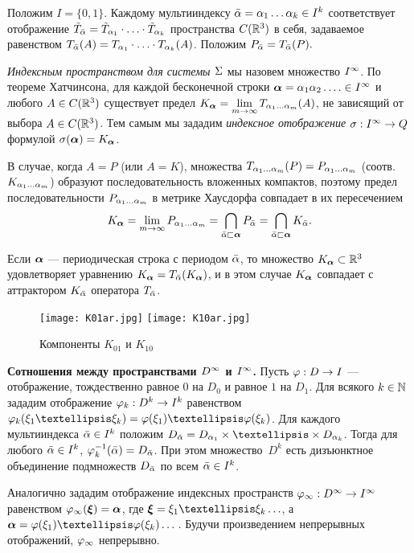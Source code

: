 Положим $I=\{0,1\}$. 
Каждому мультииндексу ${\bar{\alpha}}=\alpha_1\ldots\alpha_k\in I^k$  соответствует отображение $\tilde T_{\bar{\alpha}}={\tilde T}_{\alpha_1}\cdot\ldots\cdot{\tilde T}_{\alpha_k}$ пространства $C(\mathbb{R}^3)$ в себя, задаваемое равенством $ T_{\bar{\alpha}}(A)=T_{\alpha_1}\cdot\ldots\cdot T_{\alpha_k}(A)$. 
Положим $P_{\bar{\alpha}}=T_{\bar{\alpha}}(P).$

{\em Индексным пространством для системы $\Sigma$} мы назовем множество $I^\infty$. 
По теореме Хатчинсона, для каждой бесконечной строки ${\bm{\alpha}}=\alpha_1\alpha_2\ldots.\in I^\infty$  и любого $A\in C(\mathbb{R}^3)$ существует предел $K_{\bm{\alpha}}=\lim\limits_{m\to\infty}T_{\alpha_1\ldots\alpha_m}(A)$, не зависящий от выбора   $A\in C(\mathbb{R}^3)$. 
Тем самым  мы зададим {\em индексное отображение} $\sigma:I^\infty\to Q$ формулой $\sigma({\bm{\alpha}})=K_{\bm{\alpha}}$.

В случае, когда $A=P$ (или $A=K$), множества $T_{\alpha_1\ldots\alpha_m}(P)=P_{\alpha_1\ldots\alpha_m}$ (соотв. $K_{\alpha_1\ldots\alpha_m}$) образуют последовательность вложенных компактов, поэтому предел последовательности $P_{\alpha_1\ldots\alpha_m}$ в метрике Хаусдорфа совпадает в их пересечением
\begin{equation}\label{sigma} 
K_{\bm{\alpha}}=\lim\limits_{m\to\infty}P_{\alpha_1\ldots\alpha_m}=\bigcap\limits_{{\bar{\alpha}}\sqsubset {\bm{\alpha}}}P_{\bar{\alpha}}=\bigcap\limits_{{\bar{\alpha}}\sqsubset {\bm{\alpha}}}K_{\bar{\alpha}}.
\end{equation}

Если ${\bm{\alpha}}$ --- периодическая строка с периодом $\bar{\alpha}$, то множество $K_{\bm{\alpha}}\subset \mathbb{R}^3$ удовлетворяет уравнению $K_{\bm{\alpha}}=T_{\bar{\alpha}}(K_{\bm{\alpha}})$, и  в этом случае $K_{\bm{\alpha}}$ совпадает с аттрактором  $K_{\bar{\alpha}}$ оператора  $T_{\bar{\alpha}}$.


\begin{figure}[H]
\centering
\qquad
\texttt{[image: K01ar.jpg]}
\hfill
\texttt{[image: K10ar.jpg]}
\qquad
\caption{Компоненты $K_{01}$ и $K_{10}$}
\label{fig:5_4}
\end{figure}


{\bf Сотношения между пространствами $D^\infty$ и $I^\infty$.} Пусть $\varphi:D\to I$  ---  отображение, тождественно равное $0$ на   $D_0$ и равное $1$ на $D_1$. 
Для всякого $k\in\mathbb{N}$ зададим отображение $\varphi_k:D^k\to I^k$ равенством $\fy_k(\xi_1…\xi_k)=\fy(\xi_1)…\fy(\xi_k)$.
Для каждого мультииндекса  ${\bar{\alpha}}\in I^k$ положим $D_\bal=D_{\al_1}\times…\times D_{\al_k}$. 
Тогда для любого ${\bar{\alpha}}\in I^k$, $ \varphi_k^{-1}({\bar{\alpha}})=D_{\bar{\alpha}}$.
При этом множество~$D^k$ есть дизъюнктное объединение подмножеств $D_{\bar{\alpha}}$ по всем ${\bar{\alpha}}\in I^k$.

Аналогично зададим отображение индексных пространств $\varphi_\infty: D^\infty\to I^\infty$ равенством $\varphi_\infty({\bm{\xi}})={\bm{\alpha}}$, где  $\bmx=\xi_1…\xi_k\ldots$, а  $\bma=\fy(\xi_1)…\fy(\xi_k)\ldots$\,. 
Будучи произведением непрерывных отображений, $\varphi_\infty$ непрерывно.

